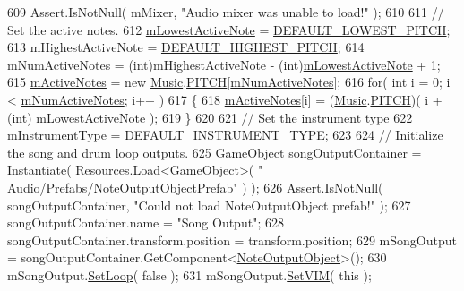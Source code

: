 \begin{DoxyCodeInclude}
609         Assert.IsNotNull( mMixer, \textcolor{stringliteral}{"Audio mixer was unable to load!"} );
610 
611         \textcolor{comment}{// Set the active notes.}
612         \hyperlink{group___v_i_m_priv_ga5e3a5116e0dabb37e0ea21d73ac1567e}{mLowestActiveNote} = \hyperlink{group___v_i_m_const_ga0ae09555ae6bc8a04110599510a0d77d}{DEFAULT\_LOWEST\_PITCH};
613         mHighestActiveNote = \hyperlink{group___v_i_m_const_gadb93993bf989a9ac6e95be9e1561a5bb}{DEFAULT\_HIGHEST\_PITCH};
614         mNumActiveNotes = (int)mHighestActiveNote - (\textcolor{keywordtype}{int})\hyperlink{group___v_i_m_priv_ga5e3a5116e0dabb37e0ea21d73ac1567e}{mLowestActiveNote} + 1;
615         \hyperlink{group___v_i_m_priv_ga5cedf9995d59b416412677e6004b659c}{mActiveNotes} = \textcolor{keyword}{new} \hyperlink{class_music}{Music}.\hyperlink{group___music_enums_ga508f69b199ea518f935486c990edac1d}{PITCH}[\hyperlink{group___v_i_m_priv_ga0f7e11945763c48057be326b661dfdaf}{mNumActiveNotes}];
616         \textcolor{keywordflow}{for}( \textcolor{keywordtype}{int} i = 0; i < \hyperlink{group___v_i_m_priv_ga0f7e11945763c48057be326b661dfdaf}{mNumActiveNotes}; i++ )
617         \{
618             \hyperlink{group___v_i_m_priv_ga5cedf9995d59b416412677e6004b659c}{mActiveNotes}[i] = (\hyperlink{class_music}{Music}.\hyperlink{group___music_enums_ga508f69b199ea518f935486c990edac1d}{PITCH})( i + (\textcolor{keywordtype}{int})
      \hyperlink{group___v_i_m_priv_ga5e3a5116e0dabb37e0ea21d73ac1567e}{mLowestActiveNote} );
619         \}
620 
621         \textcolor{comment}{// Set the instrument type}
622         \hyperlink{group___v_i_m_priv_ga108c350257b3a2080e06cd4a8251f6a4}{mInstrumentType} = \hyperlink{group___v_i_m_const_gad74e35b317d6cc0bb57a78117fa430e6}{DEFAULT\_INSTRUMENT\_TYPE};
623 
624         \textcolor{comment}{// Initialize the song and drum loop outputs.}
625         GameObject songOutputContainer = Instantiate( Resources.Load<GameObject>( \textcolor{stringliteral}{"
      Audio/Prefabs/NoteOutputObjectPrefab"} ) );
626         Assert.IsNotNull( songOutputContainer, \textcolor{stringliteral}{"Could not load NoteOutputObject prefab!"} );
627         songOutputContainer.name = \textcolor{stringliteral}{"Song Output"};
628         songOutputContainer.transform.position = transform.position;
629         mSongOutput = songOutputContainer.GetComponent<\hyperlink{class_note_output_object}{NoteOutputObject}>();
630         mSongOutput.\hyperlink{group___n_o_o_pub_func_ga7b79bbd2c7a68831b322edff140f29d2}{SetLoop}( \textcolor{keyword}{false} );
631         mSongOutput.\hyperlink{group___n_o_o_pub_func_gaca261a6f8d95fc7f81bbc3c8108bad58}{SetVIM}( \textcolor{keyword}{this} );

\end{DoxyCodeInclude}

